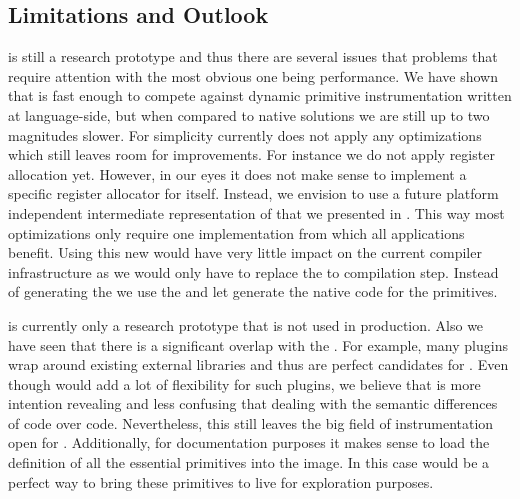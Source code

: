 

\subsection{\WF Limitations and Outlook}

\WF is still a research prototype and thus there are several issues that problems that require attention with the most obvious one being performance.
We have shown that \WF is fast enough to compete against dynamic primitive instrumentation written at language-side, but when compared to native solutions we are still up to two magnitudes slower.
For simplicity \WF currently does not apply any optimizations which still leaves room for improvements.
For instance we do not apply register allocation yet.
However, in our eyes it does not make sense to implement a specific register allocator for \WF itself.
Instead, we envision to use a future platform independent intermediate representation of \B that we presented in .
This way most optimizations only require one implementation from which all \B applications benefit.
Using this new \IR would have very little impact on the current \WF compiler infrastructure as we would only have to replace the \AST to \ASM compilation step.
Instead of generating the \ASM we use the \B \IR and let \B generate the native code for the primitives.

\WF is currently only a research prototype that is not used in production.
Also we have seen that there is a significant overlap with the \NB \FFI.
For example, many plugins wrap around existing external libraries and thus are perfect candidates for \NB.
Even though \WF would add a lot of flexibility for such plugins, we believe that \NB is more intention revealing and less confusing that dealing with the semantic differences of \Slang code over \PH code.
Nevertheless, this still leaves the big field of instrumentation open for \WF.
Additionally, for documentation purposes it makes sense to load the \Slang definition of all the essential primitives into the \PH image.
In this case \WF would be a perfect way to bring these primitives to live for exploration purposes.

